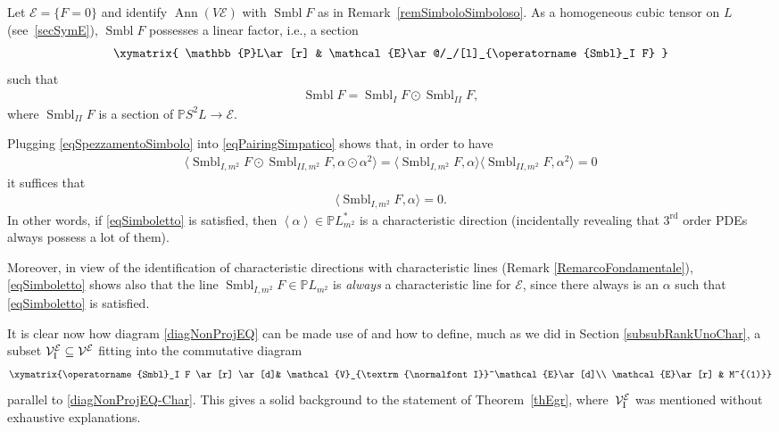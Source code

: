\documentclass[10pt,a4paper]{amsart}
\newcommand{\M}{\mathcal{V}}
\newcommand{\MM}{\mathcal{V}_{\textrm{\normalfont I}}}
\newcommand{\E}{\mathcal{E}}
\newcommand{\Ann}{\operatorname{Ann}}
\newcommand{\Span}[1]{\left\langle #1 \right\rangle}
\renewcommand{\P}{\mathbb{P}}
\newcommand{\Rd}{^\textrm{rd}}
\numberwithin{equation}{section}
\begin{document}
Let $\E=\{F=0\}$ and identify $\Ann(V\E)$ with $\operatorname{Smbl} F$ as in Remark~\ref{remSimboloSimboloso}.
As a homogeneous cubic tensor on $L$ (see~\eqref{secSymE}), $\operatorname{Smbl} F$ possesses a linear factor, i.e., a section
\begin{gather*}%
\xymatrix{
\P L\ar[r] &
\E\ar@/_/[l]_{\operatorname{Smbl}_I F}
}
\end{gather*}
such that
\begin{gather}\label{eqSpezzamentoSimbolo}
\operatorname{Smbl} F=\operatorname{Smbl}_I F\odot \operatorname{Smbl}_{II} F,
\end{gather}
 where $ \operatorname{Smbl}_{II} F$ is a section of $\P S^2L\rightarrow \E$.

 Plugging \eqref{eqSpezzamentoSimbolo} into \eqref{eqPairingSimpatico} shows that, in order to have
 \begin{gather*}%
\big\langle \operatorname{Smbl}_{I,m^2}{ F}\odot \operatorname{Smbl}_{II,m^2} F, \alpha\odot\alpha^2 \big\rangle=\langle \operatorname{Smbl}_{I,m^2}{F},\alpha\rangle \big\langle \operatorname{Smbl}_{II,m^2}{F},\alpha^2\big\rangle=0
\end{gather*}
 it suf\/f\/ices that
 \begin{gather}\label{eqSimboletto}
\langle \operatorname{Smbl}_{I,m^2}{F},\alpha\rangle=0.
\end{gather}
In other words, if \eqref{eqSimboletto} is satisf\/ied, then $\Span{\alpha}\in \P L_{m^2}^\ast$ is a characteristic direction (incidentally revealing that $3\Rd$ order PDEs always possess a lot of them).

 Moreover, in view of the identif\/ication of characteristic directions with characteristic lines (Remark \ref{RemarcoFondamentale}), \eqref{eqSimboletto} shows also that the line $\operatorname{Smbl}_{I,m^2}{F}\in \P L_{m^2}$ is \emph{always} a characteristic line for $\E$, since there always is an $\alpha$ such that \eqref{eqSimboletto} is satisf\/ied.

It is clear now how diagram \eqref{diagNonProjEQ} can be made use of and how to def\/ine, much as we did in Section \ref{subsubRankUnoChar}, a subset $\MM^\E\subseteq\M^\E$ f\/itting into the commutative diagram
\begin{gather*}%
\xymatrix{\operatorname{Smbl}_I F \ar[r] \ar[d]& \MM^\E\ar[d]\\
\E\ar[r] & M^{(1)}}
\end{gather*}
parallel to \eqref{diagNonProjEQ-Char}. This gives a solid background to the statement of Theorem~\ref{thEgr}, where~$\MM^\E$ was mentioned without exhaustive explanations.
\end{document}
